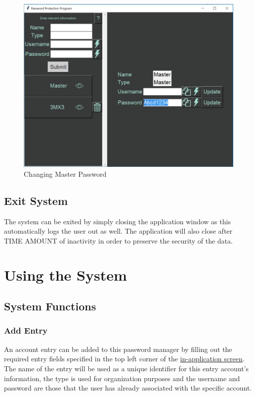 \documentclass[12pt, titlepage]{article}
\begin{document}
\begin{figure}[h]
	\centering
	\includegraphics[scale=1.0]{images/ChangeMasPass.PNG}
	\caption{Changing Master Password}
	\label{fig:chMasPass}
\end{figure}


\subsection{Exit System} \label{SysExit}

The system can be exited by simply closing the application window as this automatically logs the user out as well. The application will also close after TIME AMOUNT of inactivity in order to preserve the security of the data.


\newpage
\section{Using the System} \label{SysUse}


\subsection{System Functions} \label{SysFunc}

\subsubsection{Add Entry} \label{AddEnt}

An account entry can be added to this password manager by filling out the required entry fields specified in the top left corner of the \hyperref[fig:InApp]{in-application screen}. The name of the entry will be used as a unique identifier for this entry account's information, the type is used for organization purposes and the username and password are those that the user has already associated with the specific account.
\end{document}
